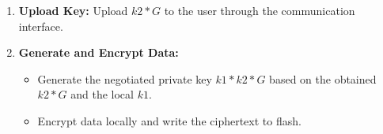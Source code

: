 \documentclass[main\_\_EN.tex]{subfiles}
\begin{document}
\begin{enumerate}
\begin{enumerate}
        \item After entering the GAIN phase, read out \hyperref[para:keyinfo]{\begin{math}key\_info\end{math}} and \begin{math}k2*G\end{math}, then configure \hyperref[fielddesc:KEYMNGCONTINUE]{KEYMNG\_CONTINUE}.
        \item Wait for the Key Manager to return to the IDLE phase.
    \end{enumerate}
    \item \textbf{Upload Key:} Upload \begin{math}k2*G\end{math} to the user through the communication interface.
    \item \textbf{Generate and Encrypt Data:} 
    \begin{itemize}
        \item Generate the negotiated private key \begin{math}k1*k2*G\end{math} based on the obtained \begin{math}k2*G\end{math} and the local \begin{math}k1\end{math}. 
        \item Encrypt data locally and write the ciphertext to flash.
    \end{itemize}
\end{enumerate}
\end{document}

